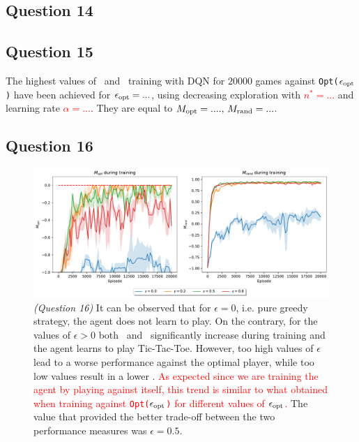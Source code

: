\documentclass[10pt]{IEEEtran}
\begin{document}
\subsection*{Question 14}
\subsection*{Question 15}
The highest values of \mopt\  and \mrand\  training with DQN for $20000$ games against \texttt{Opt($\epsilon_{\text{opt}}$)} have been achieved for \textcolor{red}{$\epsilon_{\text{opt}} = ...$}, using decreasing exploration with \textcolor{red}{$n^* = ...$} and learning rate \textcolor{red}{$\alpha = ...$}. They are equal to \textcolor{red}{$M_{\text{opt}} = ...., \, M_{\text{rand}} = ...$}.
\subsection*{Question 16}
\begin{figure}[h]
    \centering
    \includegraphics[width = \linewidth]{code/figures/performance_epsilon_dqn_self.pdf}
    \caption{\emph{(Question 16)}
    It can be observed that for $\epsilon = 0$, i.e. pure greedy strategy, the agent does not learn to play. On the contrary, for the values of $\epsilon > 0$ both \mopt\ and \mrand\ significantly increase during training and the agent learns to play Tic-Tac-Toe. However, too high values of $\epsilon$ lead to a worse performance against the optimal player, while too low values result in a lower \mrand. \textcolor{red}{As expected since we are training the agent by playing against itself, this trend is similar to what obtained when training against \texttt{Opt($\epsilon_{\text{opt}}$)} for different values of $\epsilon_{\text{opt}}$.} The value that provided the better trade-off between the two performance measures was $\epsilon = 0.5$.}
    \label{plot_question16}
\end{figure}
\end{document}
